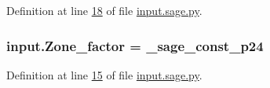 Definition at line \hyperlink{input_8sage_8py_source_l00018}{18} of file \hyperlink{input_8sage_8py_source}{input.\+sage.\+py}.

\hypertarget{namespaceinput_aeea70e58ec9bb0d3d6c4363867eb0f82}{}
\subsubsection[{Zone\+\_\+factor}]{\setlength{\rightskip}{0pt plus 5cm}input.\+Zone\+\_\+factor = \+\_\+sage\+\_\+const\+\_\+p24}\label{namespaceinput_aeea70e58ec9bb0d3d6c4363867eb0f82}


Definition at line \hyperlink{input_8sage_8py_source_l00015}{15} of file \hyperlink{input_8sage_8py_source}{input.\+sage.\+py}.


